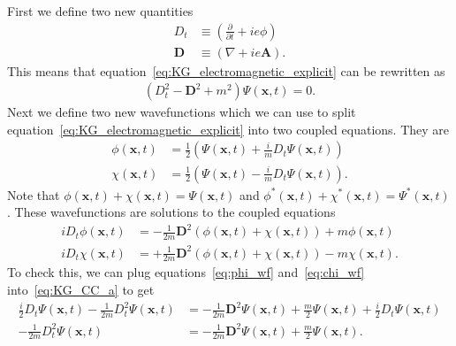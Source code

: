 \documentclass[titlepage,letterpaper,onecolumn,11pt,final]{report}
\newcommand{\psxt}{\Psi (\mathbf{x},t)}
\numberwithin{equation}{section}
\numberwithin{figure}{section}
\begin{document}
First we define two new quantities
\begin{subequations}
\begin{align}
	\label{eq:define_Dt}
	D_{t} & \equiv (\frac{\partial}{\partial t} + i e \phi)\\
	\label{eq:define_D}
	\mathbf{D} & \equiv (\nabla + i e \mathbf{A}) .
\end{align}
\end{subequations}
This means that equation~\ref{eq:KG_electromagnetic_explicit} can be rewritten as
\begin{gather}
	\label{eq:KG_electromagnetic_mod}
	\left( D_{t}^{2} - \mathbf{D}^{2} + m^{2} \right) \psxt = 0 .
\end{gather}
%
Next we define two new wavefunctions which we can use to split equation~\ref{eq:KG_electromagnetic_explicit} into two coupled equations. They are
\begin{subequations}
\begin{align}
	\label{eq:phi_wf}
	\phi (\mathbf{x}, t) &= \frac{1}{2} \left( \psxt + \frac{i}{m} D_{t} \psxt \right) \\
	\label{eq:chi_wf}
	\chi (\mathbf{x}, t) &= \frac{1}{2} \left( \Psi (\mathbf{x}, t) - \frac{i}{m} D_{t} \Psi (\mathbf{x}, t) \right) .
\end{align}
\end{subequations}
%
Note that $\phi (\mathbf{x}, t) + \chi (\mathbf{x}, t) = \Psi (\mathbf{x}, t)$ and $\phi^{*} (\mathbf{x}, t) + \chi^{*} (\mathbf{x}, t) = \Psi^{*} (\mathbf{x}, t)$. These wavefunctions are solutions to the coupled equations
\begin{subequations}
\begin{align}
	\label{eq:KG_CC_a}
	i D_{t} \phi (\mathbf{x}, t) &= - \frac{1}{2 m} \mathbf{D}^{2}(\phi (\mathbf{x}, t) + \chi (\mathbf{x}, t) ) + m \phi (\mathbf{x}, t) \\
	\label{eq:KG_CC_b}
	i D_{t} \chi (\mathbf{x}, t) &= + \frac{1}{2 m} \mathbf{D}^{2}(\phi (\mathbf{x}, t) + \chi (\mathbf{x}, t) ) - m \chi (\mathbf{x}, t) .
\end{align}
\end{subequations}
%
To check this, we can plug equations~\ref{eq:phi_wf} and~\ref{eq:chi_wf} into~\ref{eq:KG_CC_a} to get
\begin{equation}
\begin{split}
	\frac{i}{2} D_{t} \Psi (\mathbf{x}, t) - \frac{1}{2 m} D_{t}^{2} \Psi (\mathbf{x}, t) &= - \frac{1}{2 m} \mathbf{D}^{2} \Psi (\mathbf{x}, t) + \frac{m}{2} \Psi (\mathbf{x}, t) + \frac{i}{2} D_{t} \Psi (\mathbf{x}, t) \\
	- \frac{1}{2 m} D_{t}^{2} \Psi (\mathbf{x}, t) &= - \frac{1}{2 m} \mathbf{D}^{2} \Psi (\mathbf{x}, t) + \frac{m}{2} \Psi (\mathbf{x}, t) .
\end{split}
\end{equation}
\end{document}
